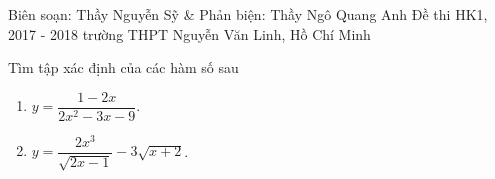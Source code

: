 \begin{name}
{Biên soạn: Thầy Nguyễn Sỹ \& Phản biện: Thầy Ngô Quang Anh}
{Đề thi HK1, 2017 - 2018 trường THPT Nguyễn Văn Linh, Hồ Chí Minh}
\end{name}

\setcounter{bt}{0}

\begin{bt}%
Tìm tập xác định của các hàm số sau
\begin{multicols}{2}
\begin{enumerate}
\item $y=\dfrac{1-2x}{2x^2-3x-9}$.
\item $y=\dfrac{2x^3}{\sqrt{2x-1}}-3\sqrt{x+2}$.
\end{enumerate}
\end{multicols}
\end{bt}

